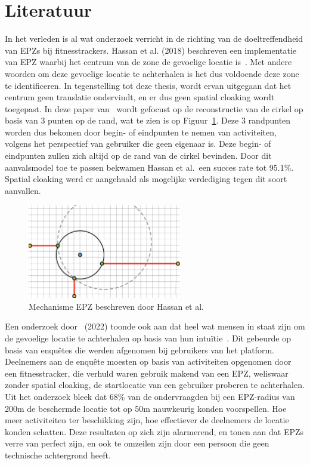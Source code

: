 \section{Literatuur}
In het verleden is al wat onderzoek verricht in de richting van de
doeltreffendheid van \acp{EPZ} bij fitnesstrackers. Hassan et al. (2018)
beschreven een implementatie van EPZ waarbij het centrum van de zone de
gevoelige locatie is~\cite{sec18has3:online}. Met andere woorden om deze
gevoelige locatie te achterhalen is het dus voldoende deze zone te
identificeren. In tegenstelling tot deze thesis, wordt ervan uitgegaan dat het
centrum geen translatie ondervindt, en er dus geen spatial cloaking wordt
toegepast. In deze paper van~\citeauthor{sec18has3:online} wordt gefocust op de
reconstructie van de cirkel op basis van 3 punten op de rand, wat te zien is op
Figuur~\ref{fig:Hassan_EPZ}. Deze 3 randpunten worden dus bekomen door begin-
of eindpunten te nemen van activiteiten, volgens het perspectief van gebruiker
die geen eigenaar is. Deze begin- of eindpunten zullen zich altijd op de rand
van de cirkel bevinden. Door dit aanvalsmodel toe te passen bekwamen Hassan et
al.\ een succes rate tot 95.1\%. Spatial cloaking werd er aangehaald als
mogelijke verdediging tegen dit soort aanvallen.
\begin{figure}[h]
    \centering
    \includegraphics[width=0.6\textwidth]{fig/EPZ-mechanisme/Hassan.png}
    \caption{Mechanisme \ac{EPZ} beschreven door Hassan et al.~\cite{sec18has3:online}}\label{fig:Hassan_EPZ}
\end{figure}

Een onderzoek door~\citeauthor{10.1145/3491102.3502136} (2022) toonde ook aan
dat heel wat mensen in staat zijn om de gevoelige locatie te achterhalen op
basis van hun intuïtie~\cite{10.1145/3491102.3502136}. Dit gebeurde op basis
van enquêtes die werden afgenomen bij gebruikers van het platform. Deelnemers
aan de enquête moesten op basis van activiteiten opgenomen door een
fitnesstracker, die verhuld waren gebruik makend van een \ac{EPZ}, weliswaar
zonder spatial cloaking, de startlocatie van een gebruiker proberen te
achterhalen. Uit het onderzoek bleek dat 68\% van de ondervraagden bij een
\ac{EPZ}-radius van 200m de beschermde locatie tot op 50m nauwkeurig konden
voorspellen. Hoe meer activiteiten ter beschikking zijn, hoe effectiever de
deelnemers de locatie konden schatten. Deze resultaten op zich zijn alarmerend,
en tonen aan dat \acp{EPZ} verre van perfect zijn, en ook te omzeilen zijn door
een persoon die geen technische achtergrond heeft.

